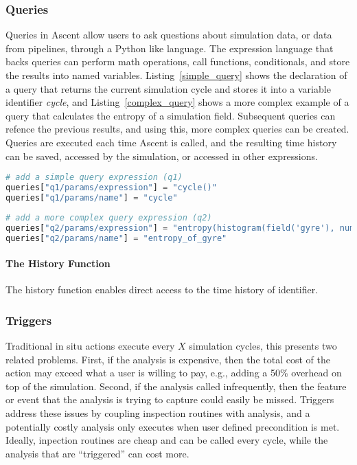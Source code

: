 \subsubsection{Queries}
\label{action_queries}
Queries in Ascent allow users to ask questions about simulation data,
or data from pipelines, through a Python like language.
%
The expression language that backs queries can perform math operations,
call functions, conditionals, and store the results into named variables.
%
Listing~\ref{simple_query} shows the declaration of a query that returns
the current simulation cycle and stores it into a variable identifier \textit{cycle},
and Listing~\ref{complex_query} shows a more complex example of a query that
calculates the entropy of a simulation field.
%
Subsequent queries can refence the previous results, and using this,
more complex queries can be created.
%
Queries are executed each time Ascent is called, and the resulting time
history can be saved, accessed by the simulation, or accessed in other
expressions.

\begin{lstlisting}[language=Python,caption={Examples of querying the simulation cycle}, label={simple_query}]
# add a simple query expression (q1)
queries["q1/params/expression"] = "cycle()"
queries["q1/params/name"] = "cycle"
\end{lstlisting}

\begin{lstlisting}[language=Python,caption={A more complex example of queries in Ascent}, label={complex_query}]
# add a more complex query expression (q2)
queries["q2/params/expression"] = "entropy(histogram(field('gyre'), num_bins=128))"
queries["q2/params/name"] = "entropy_of_gyre"
\end{lstlisting}

\paragraph{The History Function}
The history function enables direct access to the time history of identifier.
%



\subsubsection{Triggers}
Traditional in situ actions execute every $X$ simulation cycles, this presents
two related problems.
%
First, if the analysis is expensive, then the total cost of the action may exceed
what a user is willing to pay, e.g., adding a 50\% overhead on top of the simulation.
%
Second, if the analysis called infrequently, then the feature or event that the analysis is
trying to capture could easily be missed.
%
Triggers address these issues by coupling inspection routines with analysis, and a
potentially costly analysis only executes when user defined precondition is met.
%
Ideally, inpection routines are cheap and can be called every cycle, while the analysis
that are ``triggered'' can cost more.

